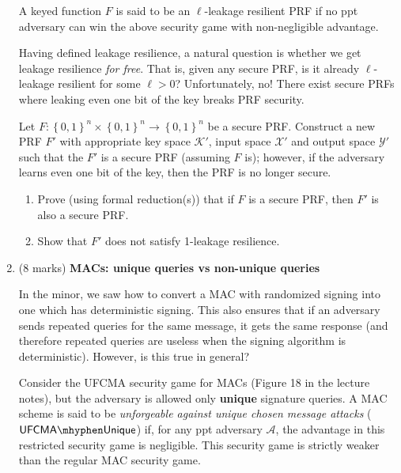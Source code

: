 \documentclass[11pt]{article}
\newcommand{\UFCMA}{\mathsf{UFCMA}}
\newcommand{\UFCMAU}{\UFCMA \mhyphen \mathsf{Unique}}
\newcommand{\bit}{\left\{0, 1\right\}}
\newcommand{\calA}{\mathcal{A}}
\newcommand{\calK}{\mathcal{K}}
\newcommand{\calX}{\mathcal{X}}
\newcommand{\calY}{\mathcal{Y}}
\begin{document}
\begin{enumerate}
        A keyed function $F$ is said to be an $\ell$-leakage resilient PRF if no ppt adversary can win the above security game with non-negligible advantage. 

        \vspace{10pt}

        Having defined leakage resilience, a natural question is whether we get leakage resilience \emph{for free}. That is, given any secure PRF, is it already $\ell$-leakage resilient for some $\ell>0$? Unfortunately, no! There exist secure PRFs where leaking even one bit of the key breaks PRF security. 
        
        
        Let $F: \bit^n \times \bit^n \to \bit^n$ be a secure PRF. Construct a new PRF $F'$ with appropriate key space $\calK'$, input space $\calX'$ and output space $\calY'$ such that the $F'$ is a secure PRF (assuming $F$ is); however, if the adversary learns even one bit of the key, then the PRF is no longer secure. 
        
        \begin{enumerate}
            \item Prove (using formal reduction(s)) that if $F$ is a secure PRF, then $F'$ is also a secure PRF. 

            \item Show that $F'$ does not satisfy 1-leakage resilience. 
        \end{enumerate}
        \newpage 
        \item (8 marks) \textbf{MACs: unique queries vs non-unique queries}

        In the minor, we saw how to convert a MAC with randomized signing into one which has deterministic signing. This also ensures that if an adversary sends repeated queries for the same message, it gets the same response (and therefore repeated queries are useless when the signing algorithm is deterministic). However, is this true in general? 
        
        Consider the UFCMA security game for MACs (Figure 18 in the lecture notes), but the adversary is allowed only \textbf{unique} signature queries. A MAC scheme is said to be \emph{unforgeable against unique chosen message attacks} ($\UFCMAU$) if, for any ppt adversary $\calA$, the advantage in this restricted security game is negligible. This security game is strictly weaker than the regular MAC security game. 

        \vspace{10pt}



\end{enumerate}
\end{document}
